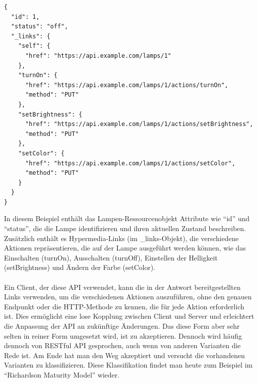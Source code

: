 \noindent\begin{minipage}{\textwidth}
\begin{lstlisting}[caption={HATEOAS Lampe},captionpos=b,label={lst:hateoas}]
{
  "id": 1,
  "status": "off",
  "_links": {
    "self": {
      "href": "https://api.example.com/lamps/1"
    },
    "turnOn": {
      "href": "https://api.example.com/lamps/1/actions/turnOn",
      "method": "PUT"
    },
    "setBrightness": {
      "href": "https://api.example.com/lamps/1/actions/setBrightness",
      "method": "PUT"
    },
    "setColor": {
      "href": "https://api.example.com/lamps/1/actions/setColor",
      "method": "PUT"
    }
  }
}
\end{lstlisting}
\end{minipage}
In diesem Beispiel enthält das Lampen-Ressourcenobjekt Attribute wie \enquote{id} und \enquote{status}, die die Lampe identifizieren und ihren aktuellen Zustand beschreiben. Zusätzlich enthält es Hypermedia-Links (im \_links-Objekt), die verschiedene Aktionen repräsentieren, die auf der Lampe ausgeführt werden können, wie das Einschalten (turnOn), Ausschalten (turnOff), Einstellen der Helligkeit (setBrightness) und Ändern der Farbe (setColor).
\\\\
Ein Client, der diese API verwendet, kann die in der Antwort bereitgestellten Links verwenden, um die verschiedenen Aktionen auszuführen, ohne den genauen Endpunkt oder die HTTP-Methode zu kennen, die für jede Aktion erforderlich ist. Dies ermöglicht eine lose Kopplung zwischen Client und Server und erleichtert die Anpassung der API an zukünftige Änderungen. Das diese Form aber sehr selten in reiner Form umgesetzt wird, ist zu akzeptieren. Dennoch wird häufig dennoch von RESTful API gesprochen, auch wenn von anderen Varianten die Rede ist. Am Ende hat man den Weg akzeptiert und versucht die vorhandenen Varianten zu klassifizieren. Diese Klassifikation findet man heute zum Beispiel im \enquote{Richardson Maturity Model} wieder. 
